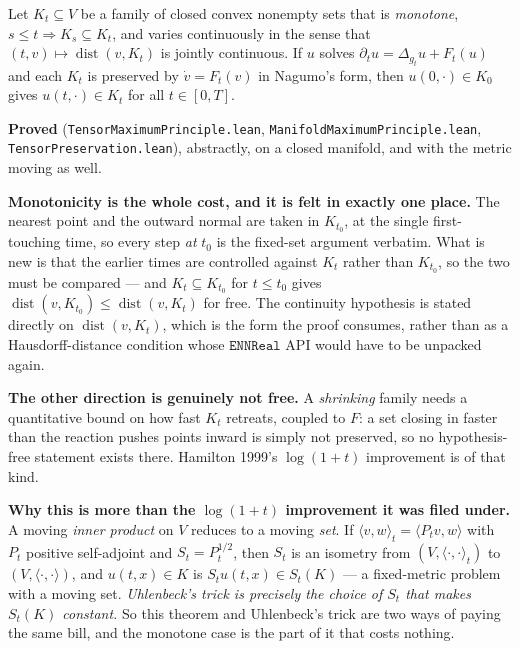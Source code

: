 \begin{theorem}
  \label{thm:max-moving-set}
  \leanok
  Let $K_t \subseteq V$ be a family of closed convex nonempty sets that is \emph{monotone},
  $s \le t \Rightarrow K_s \subseteq K_t$, and varies continuously in the sense that
  $(t,v) \mapsto \operatorname{dist}(v, K_t)$ is jointly continuous. If $u$ solves
  $\partial_t u = \Delta_{g_t} u + F_t(u)$ and each $K_t$ is preserved by $\dot v = F_t(v)$
  in Nagumo's form, then $u(0,\cdot) \in K_0$ gives $u(t,\cdot) \in K_t$ for all
  $t \in [0,T]$.

  \textbf{Proved} (\texttt{TensorMaximumPrinciple.lean},
  \texttt{ManifoldMaximumPrinciple.lean}, \texttt{TensorPreservation.lean}), abstractly, on a
  closed manifold, and with the metric moving as well.

  \textbf{Monotonicity is the whole cost, and it is felt in exactly one place.} The nearest
  point and the outward normal are taken in $K_{t_0}$, at the single first-touching time, so
  every step \emph{at} $t_0$ is the fixed-set argument verbatim. What is new is that the
  earlier times are controlled against $K_t$ rather than $K_{t_0}$, so the two must be
  compared --- and $K_t \subseteq K_{t_0}$ for $t \le t_0$ gives
  $\operatorname{dist}(v,K_{t_0}) \le \operatorname{dist}(v,K_t)$ for free. The continuity
  hypothesis is stated directly on $\operatorname{dist}(v, K_t)$, which is the form the proof
  consumes, rather than as a Hausdorff-distance condition whose $\mathtt{ENNReal}$ API would
  have to be unpacked again.

  \textbf{The other direction is genuinely not free.} A \emph{shrinking} family needs a
  quantitative bound on how fast $K_t$ retreats, coupled to $F$: a set closing in faster than
  the reaction pushes points inward is simply not preserved, so no hypothesis-free statement
  exists there. Hamilton 1999's $\log(1+t)$ improvement is of that kind.

  \textbf{Why this is more than the $\log(1+t)$ improvement it was filed under.} A moving
  \emph{inner product} on $V$ reduces to a moving \emph{set}. If
  $\langle v,w\rangle_t = \langle P_t v, w\rangle$ with $P_t$ positive self-adjoint and
  $S_t = P_t^{1/2}$, then $S_t$ is an isometry from $(V, \langle\cdot,\cdot\rangle_t)$ to
  $(V, \langle\cdot,\cdot\rangle)$, and $u(t,x) \in K$ is $S_t u(t,x) \in S_t(K)$ --- a
  fixed-metric problem with a moving set. \emph{Uhlenbeck's trick is precisely the choice of
  $S_t$ that makes $S_t(K)$ constant.} So this theorem and Uhlenbeck's trick are two ways of
  paying the same bill, and the monotone case is the part of it that costs nothing.


\end{theorem}

